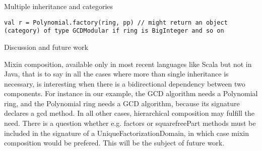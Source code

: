 \documentclass[final]{beamer}
\begin{document}
\begin{frame}[fragile]
\begin{columns}[t]
\begin{column}{.3\linewidth}
\begin{block}{\large Multiple inheritance and categories}
\begin{lstlisting}
val r = Polynomial.factory(ring, pp) // might return an object
(category) of type GCDModular if ring is BigInteger and so on
\end{lstlisting}
  \end{block}
  \hfill
  \begin{block}{\large Discussion and future work}
{\scriptsize
Mixin composition, available only in most recent languages like Scala
but not in Java, that is to say in all the cases where more than single
inheritance is necessary, is interesting when there is a bidirectional
dependency between two components. For instance in our example, the GCD
algorithm needs a Polynomial ring, and the Polynomial ring needs a GCD algorithm, because its signature declares a gcd method. In all other
cases, hierarchical composition may fulfill the need. There is a
question whether e.g. factors or squarefreePart methods must be
included in the signature of a UniqueFactorizationDomain, in which
case mixin composition would be prefered. This will be the subject
of future work.
\par}\par
  \end{block}
\end{column}

\end{columns}

\end{frame}


%
%
%
%
%
\end{document}
